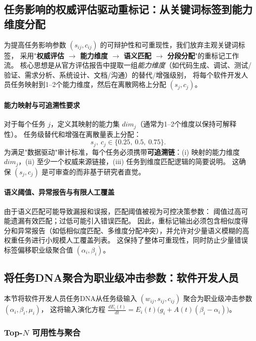 \subsection{任务影响的权威评估驱动重标记：从关键词标签到能力维度分配}

为提高任务影响参数 $(s_{ij},c_{ij})$ 的可辩护性和可重现性，我们放弃主观关键词标签，
采用"\textbf{权威评估 $\rightarrow$ 能力维度 $\rightarrow$ 语义匹配 $\rightarrow$ 分段分配}"的重标记工作流。
核心思想是从官方评估报告中提取一组\emph{能力维度}（如代码生成、调试、测试/验证、需求分析、系统设计、文档/沟通）的替代/增强级别，
将每个软件开发人员任务映射到1--2个能力维度，然后在离散网格上分配 $(s_j,c_j)$。

\paragraph{能力映射与可追溯性要求}
对于每个任务 $j$，定义其映射的能力集 $\textit{dim}_j$（通常为1--2个维度以保持可解释性）。
任务级替代和增强在离散量表上分配：
\begin{equation}
s_j,\ c_j\in\{0.25,\ 0.5,\ 0.75\}.
\end{equation}
为满足"数据驱动"审计标准，每个任务必须携带\textbf{可追溯链}：(i) 映射的能力维度 $\textit{dim}_j$，(ii) 至少一个权威来源链接，(iii) 任务到维度匹配逻辑的简要说明。
这确保 $(s_j,c_j)$ 是可审查的而非基于研究者直觉。

\paragraph{语义阈值、异常报告与有限人工覆盖}
由于语义匹配可能导致漏报和误报，匹配阈值被视为可控决策参数：
阈值过高可能遗漏有效匹配；过低可能引入错误匹配。
因此，重标记输出必须包含相似度得分和异常报告（如低相似度匹配、多维度分配冲突），并允许对少量语义模糊的高权重任务进行小规模人工覆盖列表。
这保持了整体可重现性，同时防止少量错误标签偏移职业级聚合值 $(\alpha_i,\beta_i)$。

\subsection{将任务DNA聚合为职业级冲击参数：软件开发人员}

本节将软件开发人员任务DNA从任务级输入 $(w_{ij}, s_{ij}, c_{ij})$ 聚合为职业级冲击参数 $(\alpha_i,\beta_i,\mu_i)$，
这将输入演化方程 $\frac{dE_i(t)}{dt}=E_i(t)\big(g_i + A(t)(\beta_i-\alpha_i)\big)$。

\subsubsection{Top-$N$ 可用性与聚合}

